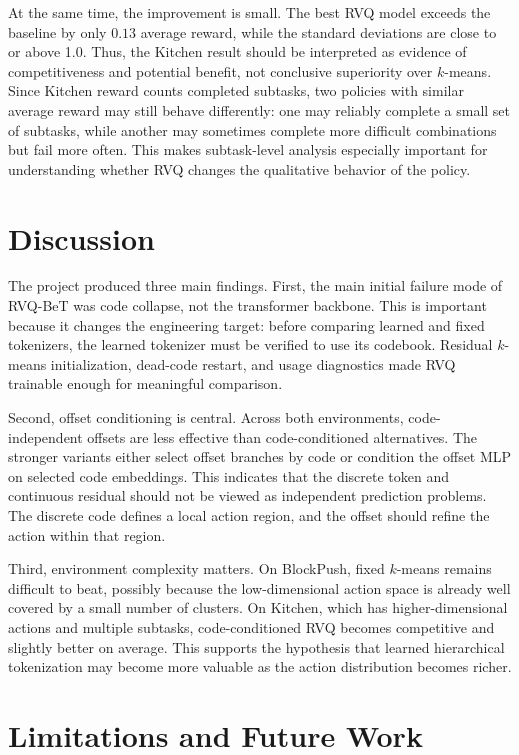 \documentclass[conference]{IEEEtran}
\begin{document}
At the same time, the improvement is small. The best RVQ model exceeds the baseline by only $0.13$ average reward, while the standard deviations are close to or above 1.0. Thus, the Kitchen result should be interpreted as evidence of competitiveness and potential benefit, not conclusive superiority over $k$-means. Since Kitchen reward counts completed subtasks, two policies with similar average reward may still behave differently: one may reliably complete a small set of subtasks, while another may sometimes complete more difficult combinations but fail more often. This makes subtask-level analysis especially important for understanding whether RVQ changes the qualitative behavior of the policy.

\section{Discussion}

The project produced three main findings. First, the main initial failure mode of RVQ-BeT was code collapse, not the transformer backbone. This is important because it changes the engineering target: before comparing learned and fixed tokenizers, the learned tokenizer must be verified to use its codebook. Residual $k$-means initialization, dead-code restart, and usage diagnostics made RVQ trainable enough for meaningful comparison.

Second, offset conditioning is central. Across both environments, code-independent offsets are less effective than code-conditioned alternatives. The stronger variants either select offset branches by code or condition the offset MLP on selected code embeddings. This indicates that the discrete token and continuous residual should not be viewed as independent prediction problems. The discrete code defines a local action region, and the offset should refine the action within that region.

Third, environment complexity matters. On BlockPush, fixed $k$-means remains difficult to beat, possibly because the low-dimensional action space is already well covered by a small number of clusters. On Kitchen, which has higher-dimensional actions and multiple subtasks, code-conditioned RVQ becomes competitive and slightly better on average. This supports the hypothesis that learned hierarchical tokenization may become more valuable as the action distribution becomes richer.

\section{Limitations and Future Work}
\end{document}
